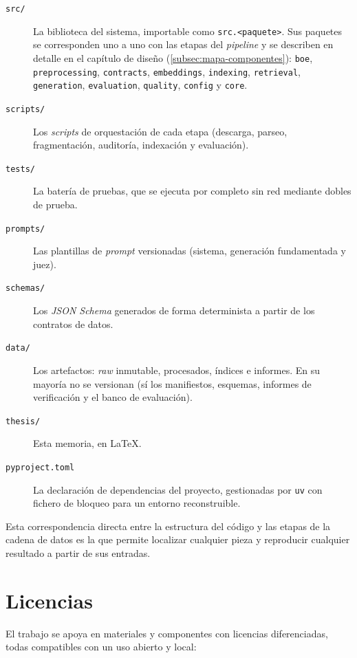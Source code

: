 \begin{description}
  \item[\texttt{src/}] La biblioteca del sistema, importable como \texttt{src.<paquete>}. Sus paquetes se corresponden uno a uno con las etapas del \emph{pipeline} y se describen en detalle en el capítulo de diseño (\ref{subsec:mapa-componentes}): \texttt{boe}, \texttt{preprocessing}, \texttt{contracts}, \texttt{embeddings}, \texttt{indexing}, \texttt{retrieval}, \texttt{generation}, \texttt{evaluation}, \texttt{quality}, \texttt{config} y \texttt{core}.
  \item[\texttt{scripts/}] Los \emph{scripts} de orquestación de cada etapa (descarga, parseo, fragmentación, auditoría, indexación y evaluación).
  \item[\texttt{tests/}] La batería de pruebas, que se ejecuta por completo sin red mediante dobles de prueba.
  \item[\texttt{prompts/}] Las plantillas de \emph{prompt} versionadas (sistema, generación fundamentada y juez).
  \item[\texttt{schemas/}] Los \emph{JSON Schema} generados de forma determinista a partir de los contratos de datos.
  \item[\texttt{data/}] Los artefactos: \emph{raw} inmutable, procesados, índices e informes. En su mayoría no se versionan (sí los manifiestos, esquemas, informes de verificación y el banco de evaluación).
  \item[\texttt{thesis/}] Esta memoria, en \LaTeX.
  \item[\texttt{pyproject.toml}] La declaración de dependencias del proyecto, gestionadas por \texttt{uv} con fichero de bloqueo para un entorno reconstruible.
\end{description}

Esta correspondencia directa entre la estructura del código y las etapas de la cadena de datos es la que permite localizar cualquier pieza y reproducir cualquier resultado a partir de sus entradas.

\section{Licencias}
\label{sec:app-licencias}

El trabajo se apoya en materiales y componentes con licencias diferenciadas, todas compatibles con un uso abierto y local:

